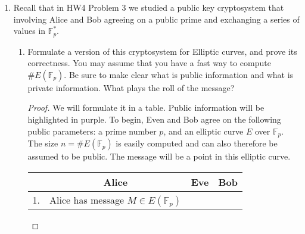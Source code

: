 \documentclass[11pt]{article}
\newcommand{\bF}{\mathbb{F}}
\begin{document}
\begin{enumerate}
{\begin{enumerate}
{    Prove that the security MV-Elgamal Problem is equivalent to the security of the ECDHP.  (Use oracles!).
    }
    \begin{proof}
      First suppose you have access to a ECDHP oracle.  You present the oracle $nP$ and $kP$ and are told the value of $nkP$, from which you extract the coordinates $x_{nkP}$ and $y_{nkP}$.  You invert these to compute
      \begin{eqnarray*}
        x_{nkP}^{-1}(x^{ }_{nkP}m_1)\equiv m_1\mod p&\text{   and   }& y_{nkP}^{-1}(y^{ }_{nkP}m_2)\equiv m_2\mod p,
      \end{eqnarray*}
      thereby solving the MV-Elgamal problem.  Conversely, suppose you are given $nQ$ and $mQ$ and access to an MV-Elgamal oracle.  You present your MV-Elgamal oracle with $nQ,mQ$ and any pair $c_1,c_2\in\bF_p^*$.  The oracle presents you with $x_{nmQ}^{-1}c_1$ and $y_{nmQ}^{-1}c_2$, whereby multiplying by $c_1^{-1}$ (respectively $c_2^{-1}$) and inverting you deduce $(x_{nmQ},y_{nmQ}) = nmQ$ which solves the ECDHP.
    \end{proof}
  \end{enumerate}
  }
  \item{
  Recall that in HW4 Problem 3 we studied a public key cryptosystem that involving Alice and Bob agreeing on a public prime and exchanging a series of values in $\bF_p^*$.
  \begin{enumerate}
    \item{
    Formulate a version of this cryptosystem for Elliptic curves, and prove its correctness.  You may assume that you have a fast way to compute $\#E(\bF_p)$. Be sure to make clear what is public information and what is private information.  What plays the roll of the message?
    }
    \begin{proof}
      We will formulate it in a table.  Public information will be highlighted in {\color{violet}purple}.  To begin, Even and Bob agree on the following public parameters: a prime number {\color{violet}$p$}, and an elliptic curve {\color{violet}$E$} over {\color{violet}$\bF_p$}.  The size {\color{violet}$n = \#E(\bF_p)$} is easily computed and can also therefore be assumed to be public.  The message will be a point in this elliptic curve.
      \begin{center}
        \begin{tabular}{l|c||c||c}
          &Alice &Eve& Bob\\
          \hline\hline
          1.&Alice has message $M\in E(\bF_p)$&&\\

\end{tabular}
\end{center}
\end{proof}
\end{enumerate}}
\end{enumerate}
\end{document}
